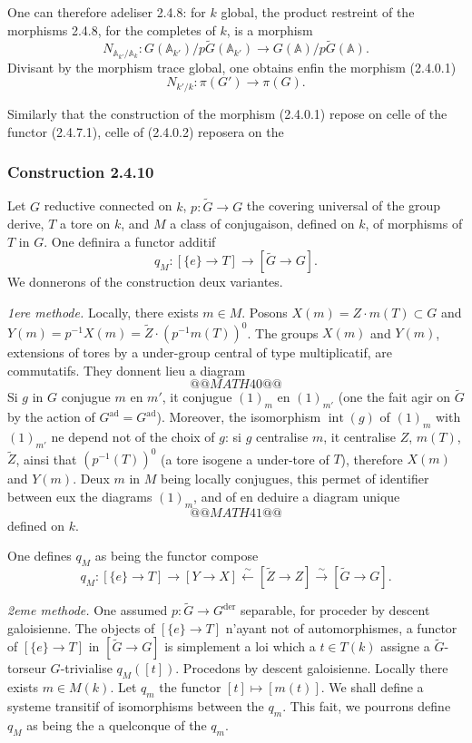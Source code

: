 \documentclass[12pt,a4paper]{article}
\theoremstyle{plain}
\theoremstyle{definition}
\theoremstyle{remark}
\DeclareMathOperator{\Int}{int}
\newcommand{\A}{\mathbb{A}}
\newcommand{\simto}{\xrightarrow{\sim}}
\begin{document}
One can therefore adeliser 2.4.8: for $k$ global, the product restreint of the morphisms 2.4.8, for the completes of $k$, is a morphism
\[
N_{\A_{k'}/\A_k}: G(\A_{k'})/p\tilde{G}(\A_{k'}) \to G(\A)/p\tilde{G}(\A).
\]
Divisant by the morphism trace global, one obtains enfin the morphism (2.4.0.1)
\[
N_{k'/k}: \pi(G') \to \pi(G).
\]

Similarly that the construction of the morphism (2.4.0.1) repose on celle of the functor (2.4.7.1), celle of (2.4.0.2) reposera on the

\subsubsection*{Construction 2.4.10}

Let $G$ reductive connected on $k$, $p:\tilde{G} \to G$ the covering universal of the group derive, $T$ a tore on $k$, and $M$ a class of conjugaison, defined on $k$, of morphisms of $T$ in $G$. One definira a functor additif
\[
q_M: [\{e\} \to T] \to [\tilde{G} \to G].
\]
We donnerons of the construction deux variantes.

\textit{1ere methode.} Locally, there exists $m \in M$. Posons $X(m) = Z \cdot m(T) \subset G$ and $Y(m) = p^{-1}X(m) = \tilde{Z} \cdot (p^{-1}m(T))^0$. The groups $X(m)$ and $Y(m)$, extensions of tores by a under-group central of type multiplicatif, are commutatifs. They donnent lieu a diagram
\[
@@MATH40@@
\]
Si $g$ in $G$ conjugue $m$ en $m'$, it conjugue $(1)_m$ en $(1)_{m'}$ (one the fait agir on $\tilde{G}$ by the action of $G^{\text{ad}} = G^{\text{ad}}$). Moreover, the isomorphism $\Int(g)$ of $(1)_m$ with $(1)_{m'}$ ne depend not of the choix of $g$: si $g$ centralise $m$, it centralise $Z$, $m(T)$, $\tilde{Z}$, ainsi that $(p^{-1}(T))^0$ (a tore isogene a under-tore of $T$), therefore $X(m)$ and $Y(m)$. Deux $m$ in $M$ being locally conjugues, this permet of identifier between eux the diagrams $(1)_m$, and of en deduire a diagram unique
\[
@@MATH41@@
\]
defined on $k$.

One defines $q_M$ as being the functor compose
\[
q_M: [\{e\} \to T] \to [Y \to X] \xleftarrow{\sim} [\tilde{Z} \to Z] \simto [\tilde{G} \to G].
\]

\textit{2eme methode.} One assumed $p:\tilde{G} \to G^{\text{der}}$ separable, for proceder by descent galoisienne. The objects of $[\{e\} \to T]$ n'ayant not of automorphismes, a functor of $[\{e\} \to T]$ in $[\tilde{G} \to G]$ is simplement a loi which a $t \in T(k)$ assigne a $\tilde{G}$-torseur $G$-trivialise $q_M([t])$. Procedons by descent galoisienne. Locally there exists $m \in M(k)$. Let $q_m$ the functor $[t] \mapsto [m(t)]$. We shall define a systeme transitif of isomorphisms between the $q_m$. This fait, we pourrons define $q_M$ as being the a quelconque of the $q_m$.
\end{document}
